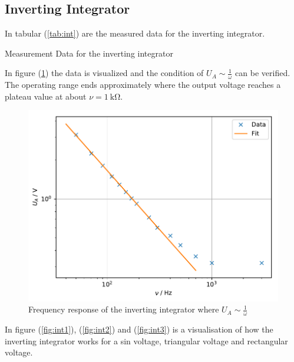 \subsection{Inverting Integrator}
In tabular (\ref{tab:int}) are the measured data for the inverting integrator.
\begin{table}[H]
  \centering
  \caption{Measurement Data for the inverting integrator} \label{tab:int}
\end{table}
\noindent
In figure (\ref{fig:int}) the data is visualized and the condition of $U_A \sim \frac{1}{\omega}$ can be verified. The operating range
ends approximately where the output voltage reaches a plateau value at about $\nu = \SI{1}{\kilo\ohm}$.
\begin{figure}[H]
\centering
\includegraphics[scale=.75]{plot4.pdf}
\caption{Frequency response of the inverting integrator where $U_A \sim \frac{1}{\omega}$}\label{fig:int}
\end{figure}
\noindent
In figure (\ref{fig:int1}), (\ref{fig:int2}) and (\ref{fig:int3}) is a visualisation of how the inverting integrator works for
a sin voltage, triangular voltage and rectangular voltage.
